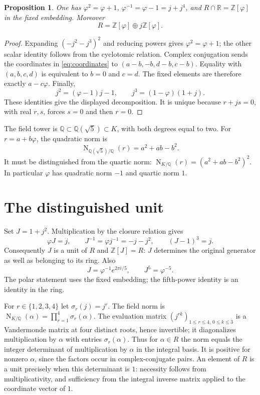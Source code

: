 \documentclass[11pt,a4paper]{article}
\newtheorem{proposition}{Proposition}
\newcommand{\Z}{\mathbb Z}
\newcommand{\Q}{\mathbb Q}
\newcommand{\ph}{\varphi}
\newcommand{\Nm}{\operatorname{N}}
\begin{document}
\begin{proposition}\label{prop:real}
One has $\ph^2=\ph+1$, $\ph^{-1}=\ph-1=j+j^4$, and
$R\cap\mathbb R=\Z[\ph]$ in the fixed embedding. Moreover
\[
 R=\Z[\ph]\oplus j\Z[\ph].
\]
\end{proposition}
\begin{proof}
Expanding $(-j^2-j^3)^2$ and reducing powers gives $\ph^2=\ph+1$;
the other scalar identity follows from the cyclotomic relation.
Complex conjugation sends the coordinates in \eqref{eq:coordinates} to
$(a-b,-b,d-b,c-b)$. Equality with $(a,b,c,d)$ is equivalent to
$b=0$ and $c=d$. The fixed elements are therefore exactly $a-c\ph$.
Finally,
\[
 j^2=(\ph-1)j-1,\qquad j^3=(1-\ph)(1+j).
\]
These identities give the displayed decomposition. It is unique because
$r+js=0$, with real $r,s$, forces $s=0$ and then $r=0$.
\end{proof}

The field tower is $\Q\subset\Q(\sqrt5)\subset K$, with both degrees
equal to two. For $r=a+b\ph$, the quadratic norm is
\[
 \Nm_{\Q(\sqrt5)/\Q}(r)=a^2+ab-b^2.
\]
It must be distinguished from the quartic norm:
$\Nm_{K/\Q}(r)=(a^2+ab-b^2)^2$. In particular $\ph$ has
quadratic norm $-1$ and quartic norm $1$.

\section{The distinguished unit}\label{sec:unit}
Set $J=1+j^2$. Multiplication by the closure relation gives
\begin{equation}\label{eq:unit}
 \ph J=j,\qquad J^{-1}=\ph j^{-1}=-j-j^2,\qquad (J-1)^3=j.
\end{equation}
Consequently $J$ is a unit of $R$ and $\Z[J]=R$: $J$ determines
the original generator as well as belonging to its ring. Also
\begin{equation}\label{eq:polar}
 J=\ph^{-1}e^{2\pi i/5},\qquad J^5=\ph^{-5}.
\end{equation}
The polar statement uses the fixed embedding; the fifth-power identity
is an identity in the ring.

For $r\in\{1,2,3,4\}$ let $\sigma_r(j)=j^r$. The field norm is
$\Nm_{K/\Q}(\alpha)=\prod_{r=1}^4\sigma_r(\alpha)$.
The evaluation matrix $(j^{rk})_{1\leq r\leq4,\,0\leq k\leq3}$
is a Vandermonde matrix at four distinct roots, hence invertible;
it diagonalizes multiplication by $\alpha$ with entries $\sigma_r(\alpha)$.
Thus for $\alpha\in R$ the norm equals the integer determinant of
multiplication by $\alpha$ in the integral basis. It is positive for
nonzero $\alpha$, since the factors occur in complex-conjugate pairs.
An element of $R$
is a unit precisely when this determinant is $1$: necessity follows
from multiplicativity, and sufficiency from the integral inverse
matrix applied to the coordinate vector of $1$.
\end{document}
